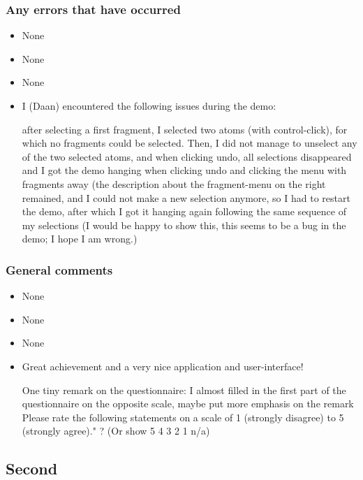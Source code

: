 \subsubsection{Any errors that have occurred}
\begin{itemize}
\item None

\item None

\item None

\item I (Daan) encountered the following issues during the demo:

after selecting a first fragment, I selected two atoms (with control-click), for which no fragments could be selected. Then, I did not manage to unselect any of the two selected atoms, and when clicking undo, all selections disappeared and I got the demo hanging when clicking undo and clicking the menu with fragments away (the description about the fragment-menu on the right remained, and I could not make a new selection anymore, so I had to restart the demo, after which I got it hanging again following the same sequence of my selections (I would be happy to show this, this seems to be a bug in the demo; I hope I am wrong.)

\end{itemize}


\subsubsection{General comments}
\begin{itemize}
\item None

\item None

\item None

\item Great achievement and a very nice application and user-interface!



One tiny remark on the questionnaire:  I almost filled in the first part of the questionnaire on the opposite scale, maybe put more emphasis on the remark Please rate the following statements on a scale of 1 (strongly disagree) to 5 (strongly agree)."  ?   (Or show 5  4  3  2  1  n/a) 

\end{itemize}


\subsection{Second}
